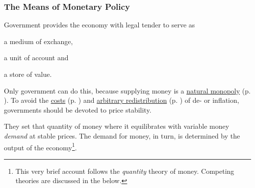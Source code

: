 \subsubsection[Monetary Policy]{The Means of Monetary Policy} \label{sec:monetary}
Government provides the economy with legal tender to serve as \begin{inparaenum}[1)] 
	\item a medium of exchange, 
	\item a unit of account and 
	\item a store of value. 
\end{inparaenum} 
Only government can do this, because supplying money is a \hyperref[sec:natural_monopoly]{natural monopoly} (p. \pageref{sec:natural_monopoly}). To avoid the \hyperref[sec:price_stability]{costs} (p. \pageref{sec:price_stability}) and  \hyperref[sec:distributive_effects_of_inflation]{arbitrary redistribution} (p. \pageref{sec:distributive_effects_of_inflation}) of de- or inflation, 
governments should be devoted to price stability. 

They set that quantity of money where it equilibrates with variable money \emph{demand} at stable prices. The demand for money, in turn, is determined by the output of the economy\footnote{
	This very brief account follows the \emph{quantity} theory of money. Competing theories are discussed in the below.}.

